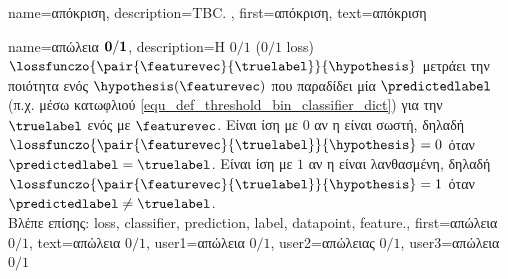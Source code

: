 
{name={\foreignlanguage{greek}{απόκριση}},
	description={TBC. },  
 	first={\foreignlanguage{greek}{απόκριση}}, 
 	text={\foreignlanguage{greek}{απόκριση}}
}

{name={\foreignlanguage{greek}{απώλεια} $\bf 0/1$},
	description={\foreignlanguage{greek}{H}  $0/1$ ($0/1$ loss)
		$\lossfunczo{\pair{\featurevec}{\truelabel}}{\hypothesis}$ \foreignlanguage{greek}{μετράει την ποιότητα ενός} 
		 $\hypothesis(\featurevec)$ \foreignlanguage{greek}{που παραδίδει μία} 
		 $\predictedlabel$ (\foreignlanguage{greek}{π.χ. μέσω κατω\-φλιού} \eqref{equ_def_threshold_bin_classifier_dict}) 
		\foreignlanguage{greek}{για την}  $\truelabel$ \foreignlanguage{greek}{ενός}  
		\foreignlanguage{greek}{με}  $\featurevec$. \foreignlanguage{greek}{Εί\-ναι ίση με $0$ αν η} 
		 \foreignlanguage{greek}{είναι σωστή, δηλαδή 
		$\lossfunczo{\pair{\featurevec}{\truelabel}}{\hypothesis}=0$ όταν $\predictedlabel=\truelabel$. Είναι ίση με
		$1$ αν η}  \foreignlanguage{greek}{είναι λανθασμένη, δηλαδή $\lossfunczo{\pair{\featurevec}{\truelabel}}{\hypothesis}=1$ 
		όταν} $\predictedlabel\neq\truelabel$.
		\\
		\foreignlanguage{greek}{Βλέπε επίσης:} \gls{loss}, \gls{classifier}, \gls{prediction}, \gls{label}, \gls{datapoint}, \gls{feature}.},
    	first={\foreignlanguage{greek}{απώλεια $0/1$}},
    	text={\foreignlanguage{greek}{απώλεια $0/1$}},
    	user1={\foreignlanguage{greek}{απώλεια $0/1$}}, %
    	user2={\foreignlanguage{greek}{απώλειας $0/1$}}, %
    	user3={\foreignlanguage{greek}{απώλεια $0/1$}} %
}

